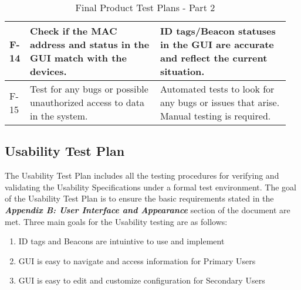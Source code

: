 \begin{table}[h!]
\begin{tabular}{|m{0.05\linewidth}|m{0.45\linewidth}|m{0.45\linewidth}|}
    F-14
    & Check if the MAC address and status in the GUI match with the devices.
    & ID tags/Beacon statuses in the GUI are accurate and reflect the current situation.  \\ 
    \hline

    F-15
    & Test for any bugs or possible unauthorized access to data in the system.
    & Automated tests to look for any bugs or issues that arise. Manual testing is required.  \\ 
    \hline


\end{tabular}
	\caption{Final Product Test Plans - Part 2}
\end{table}



\pagebreak
\subsection{Usability Test Plan}
\medskip
The Usability Test Plan includes all the testing procedures for verifying and validating the Usability Specifications under a 
formal test environment. The goal of the Usability Test Plan is to ensure the basic requirements stated in the 
\textbf{\textit{Appendix B: User Interface and Appearance}} section of the document are met. Three main goals for the Usability testing are as follows:
\begin{enumerate}
    \item ID tags and Beacons are intuintive to use and implement
    \item GUI is easy to navigate and access information for Primary Users
    \item GUI is easy to edit and customize configuration for Secondary Users
\end{enumerate} 

